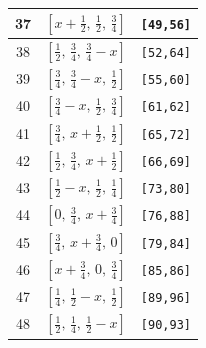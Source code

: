 \documentclass[fleqn,8pt]{jsarticle}
\begin{document}
\begin{longtable}{ccc}
37 & $\left[ x + \frac{1}{2},\, \frac{1}{2},\, \frac{3}{4} \right]$ & {\tt [49,56]} \\ \hline
38 & $\left[ \frac{1}{2},\, \frac{3}{4},\, \frac{3}{4} - x \right]$ & {\tt [52,64]} \\ \hline
39 & $\left[ \frac{3}{4},\, \frac{3}{4} - x,\, \frac{1}{2} \right]$ & {\tt [55,60]} \\ \hline
40 & $\left[ \frac{3}{4} - x,\, \frac{1}{2},\, \frac{3}{4} \right]$ & {\tt [61,62]} \\ \hline
41 & $\left[ \frac{3}{4},\, x + \frac{1}{2},\, \frac{1}{2} \right]$ & {\tt [65,72]} \\ \hline
42 & $\left[ \frac{1}{2},\, \frac{3}{4},\, x + \frac{1}{2} \right]$ & {\tt [66,69]} \\ \hline
43 & $\left[ \frac{1}{2} - x,\, \frac{1}{2},\, \frac{1}{4} \right]$ & {\tt [73,80]} \\ \hline
44 & $\left[ 0,\, \frac{3}{4},\, x + \frac{3}{4} \right]$ & {\tt [76,88]} \\ \hline
45 & $\left[ \frac{3}{4},\, x + \frac{3}{4},\, 0 \right]$ & {\tt [79,84]} \\ \hline
46 & $\left[ x + \frac{3}{4},\, 0,\, \frac{3}{4} \right]$ & {\tt [85,86]} \\ \hline
47 & $\left[ \frac{1}{4},\, \frac{1}{2} - x,\, \frac{1}{2} \right]$ & {\tt [89,96]} \\ \hline
48 & $\left[ \frac{1}{2},\, \frac{1}{4},\, \frac{1}{2} - x \right]$ & {\tt [90,93]} \\
\end{longtable}
\renewcommand{\arraystretch}{1.2}
\end{document}
